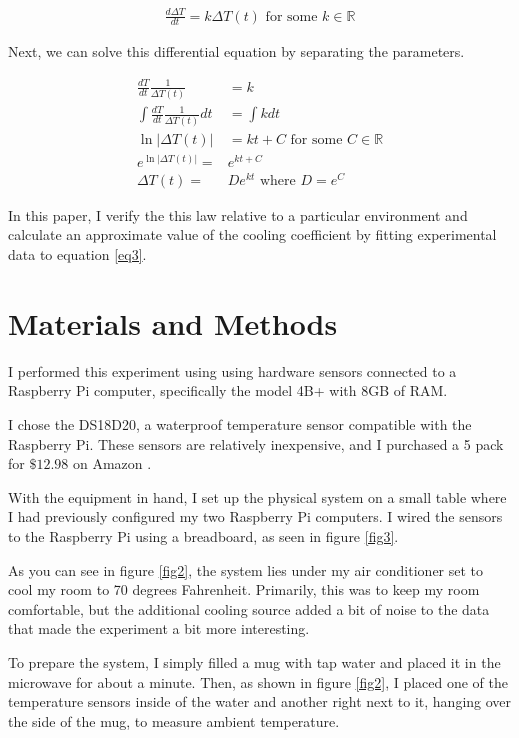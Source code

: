 \documentclass[12pt]{article}
\newcommand{\reals}{\mathbb{R}}
\begin{document}
\begin{align} \label{eq1}
	\frac{d\Delta T}{dt} = k\Delta T(t) \textrm{ for some $k \in \reals$}
\end{align}

Next, we can solve this differential equation by separating the parameters.

\begin{align} \label{eq2}
	\frac{dT}{dt}\frac{1}{\Delta T(t)} & = k \\
	\int \frac{dT}{dt}\frac{1}{\Delta T(t)} dt & = \int k dt \\
	\ln|\Delta T(t)| & = kt + C \textrm{ for some $C \in \reals$} \\
	e^{\ln | \Delta T(t) | } = & e^{kt + C} \\
	\label{eq3}
	\Delta T(t) = & De^{kt} \textrm{ where $D = e^C$ }
\end{align}

In this paper, I verify the this law
relative to a particular environment
and calculate an approximate value of the cooling coefficient
by fitting experimental data to equation \ref{eq3}.

\section{Materials and Methods}

I performed this experiment using
using hardware sensors
connected to a Raspberry Pi computer,
specifically the model 4B+ with 8GB of RAM.

I chose the DS18D20,
a waterproof temperature sensor compatible with the Raspberry Pi.
These sensors are relatively inexpensive,
and I purchased a 5 pack for $\$12.98$ on Amazon \citep{Amazon}.

With the equipment in hand,
I set up the physical system
on a small table
where I had previously configured
my two Raspberry Pi computers.
I wired the sensors to the Raspberry Pi using
a breadboard,
as seen in figure \ref{fig3}.

As you can see in figure \ref{fig2},
the system lies under my air conditioner
set to cool my room to 70 degrees Fahrenheit.
Primarily, this was to keep my room comfortable,
but the additional cooling source added
a bit of noise to the data
that made the experiment a bit more interesting.

To prepare the system,
I simply filled a mug with tap water
and placed it in the microwave
for about a minute.
Then, as shown in figure \ref{fig2},
I placed one of the temperature sensors
inside of the water
and another right next to it,
hanging over the side of the mug,
to measure ambient temperature.
\end{document}
